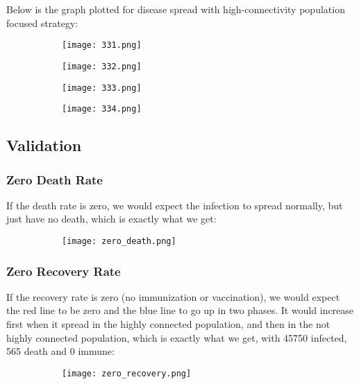 \documentclass[titlepage]{article}
\begin{document}
Below is the graph plotted for disease spread with high-connectivity population focused strategy:

\begin{figure}[H]
       \centering
       \begin{subfigure}{0.48\textwidth}
       \centering
       \texttt{[image: 331.png]}
       \end{subfigure}\quad
       \begin{subfigure}{0.48\textwidth}
       \centering
       \texttt{[image: 332.png]}
       \end{subfigure}
              \begin{subfigure}{0.48\textwidth}
       \centering
       \texttt{[image: 333.png]}
       \end{subfigure}\quad
       \begin{subfigure}{0.48\textwidth}
       \centering
       \texttt{[image: 334.png]}
       \end{subfigure}
\end{figure}

\subsection{Validation}
\subsubsection{Zero Death Rate}
If the death rate is zero, we would expect the infection to spread normally, but just have no death, which is exactly what we get:
\begin{figure}[H]
       \centering
       \begin{subfigure}{0.48\textwidth}
       \centering
       \texttt{[image: zero\_death.png]}
       \end{subfigure}\quad
\end{figure}
\subsubsection{Zero Recovery Rate}
If the recovery rate is zero (no immunization or vaccination), we would expect the red line to be zero and the blue line to go up in two phases. It would increase first when it spread in the highly connected population, and then in the not highly connected population, which is exactly what we get, with 45750 infected, 565 death and 0 immune:
\begin{figure}[H]
       \centering
       \begin{subfigure}{0.48\textwidth}
       \centering
       \texttt{[image: zero\_recovery.png]}
       \end{subfigure}\quad
\end{figure}
\end{document}
